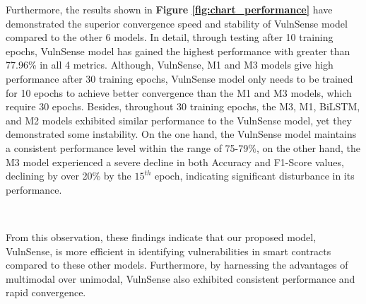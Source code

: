 Furthermore, the results shown in \textbf{Figure \ref{fig:chart_performance}} have demonstrated the superior convergence speed and stability of VulnSense model compared to the other 6 models. In detail, through testing after 10 training epochs, VulnSense model has gained the highest performance with greater than 77.96\% in all 4 metrics. Although, VulnSense, M1 and M3 models give high performance after 30 training epochs, VulnSense model only needs to be trained for 10 epochs to achieve better convergence than the M1 and M3 models, which require 30 epochs. Besides, throughout 30 training epochs, the M3, M1, BiLSTM, and M2 models exhibited similar performance to the VulnSense model, yet they demonstrated some instability. On the one hand, the VulnSense model maintains a consistent performance level within the range of 75-79\%, on the other hand, the M3 model experienced a severe decline in both Accuracy and F1-Score values, declining by over 20\% by the $15^{th}$ epoch, indicating significant disturbance in its performance.

\begin{figure*}[h]
 \centering
 \def\twidth{1}
  \hfill
  \\
  \hfill
 \caption{The performance of 7 models in 3 different mocks of training epochs.}
 \label{fig:chart_performance}
\end{figure*}

From this observation, these findings indicate that our proposed model, VulnSense, is more efficient in identifying vulnerabilities in smart contracts compared to these other models. Furthermore, by harnessing the advantages of multimodal over unimodal, VulnSense also exhibited consistent performance and rapid convergence.

